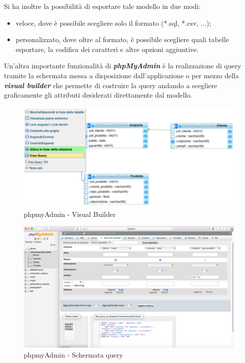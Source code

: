 Si ha inoltre la possibilità di esportare tale modello in due modi:

\begin{itemize}

\item veloce, dove è possibile scegliere solo il formato (*.sql, *.csv, ...); \item personalizzato, dove oltre al formato, è possibile scegliere quali tabelle esportare, la codifica dei caratteri e altre opzioni aggiuntive.

\end{itemize}

Un'altra importante funzionalità di \textit{\textbf{phpMyAdmin}} è la realizzazione di query tramite la schermata messa a disposizione dall'applicazione o per mezzo della \textit{\textbf{visual builder}} che permette di costruire la query andando a scegliere graficamente gli attributi desiderati direttamente dal modello.

\begin{center}
\begin{figure}[H]
\centering
\includegraphics[scale=1]{figures/phpmyAdmin_visualbuilder.png}
\caption{phpmyAdmin - Visual Builder} 
\end{figure}
\end{center}

\begin{center}
\begin{figure}[H]
\centering
\includegraphics[scale=0.8]{figures/phpmyAdmin_query.png}
\caption{phpmyAdmin - Schermata query} 
\end{figure}
\end{center}

